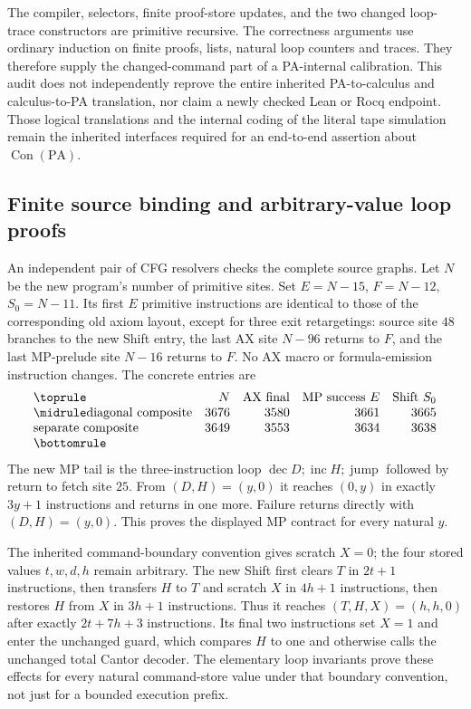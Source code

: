 The compiler, selectors, finite proof-store updates, and the two changed
loop-trace constructors are primitive recursive. The correctness arguments
use ordinary induction on finite proofs, lists, natural loop counters and
traces. They therefore supply the changed-command part of a PA-internal
calibration. This audit does not independently reprove the entire inherited
PA-to-calculus and calculus-to-PA translation, nor claim a newly checked
Lean or Rocq endpoint. Those logical translations and the internal coding
of the literal tape simulation remain the inherited interfaces required
for an end-to-end assertion about $\operatorname{Con}(\mathrm{PA})$.

\subsection{Finite source binding and arbitrary-value loop proofs}

An independent pair of CFG resolvers checks the complete source graphs.
Let $N$ be the new program's number of primitive sites. Set
$E=N-15$, $F=N-12$, $S_0=N-11$. Its first $E$ primitive instructions
are identical to those of the corresponding old axiom layout, except for
three exit retargetings: source site $48$ branches to the new Shift entry,
the last AX site $N-96$ returns to $F$, and the last MP-prelude site
$N-16$ returns to $F$. No AX macro or formula-emission instruction changes.
The concrete entries are
\[
\begin{array}{lrrrr}
\toprule
 &N&\text{AX final}&\text{MP success }E&\text{Shift }S_0\\
\midrule
\text{diagonal composite}&3676&3580&3661&3665\\
\text{separate composite}&3649&3553&3634&3638\\
\bottomrule
\end{array}
\]
The new MP tail is the three-instruction loop
$\operatorname{dec}D;\operatorname{inc}H;\operatorname{jump}$ followed
by return to fetch site $25$. From $(D,H)=(y,0)$ it reaches $(0,y)$
in exactly $3y+1$ instructions and returns in one more. Failure returns
directly with $(D,H)=(y,0)$. This proves the displayed MP contract for
every natural $y$.

The inherited command-boundary convention gives scratch $X=0$;
the four stored values $t,w,d,h$ remain arbitrary. The new Shift first
clears $T$ in $2t+1$ instructions, then transfers
$H$ to $T$ and scratch $X$ in $4h+1$ instructions, then restores $H$
from $X$ in $3h+1$ instructions. Thus it reaches $(T,H,X)=(h,h,0)$
after exactly $2t+7h+3$ instructions. Its final two instructions set
$X=1$ and enter the unchanged guard, which compares $H$ to one and
otherwise calls the unchanged total Cantor decoder. The elementary loop
invariants prove these effects for every natural command-store value
under that boundary convention, not just for a bounded execution prefix.

